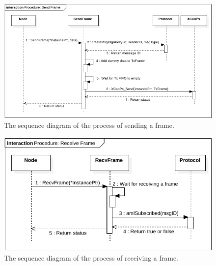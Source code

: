 \begin{figure}[h!]
	\centering
	\includegraphics[width = 1\linewidth]{graphics/SeqDiagram_SendFrame.pdf}
	\caption{The sequence diagram of the process of sending a frame.}
	\label{fig:SeqDiagram_SendFrame}
\end{figure}

\begin{figure}[h!]
	\centering
	\includegraphics[width = 1\linewidth]{graphics/SeqDiagram_RecvFrame.pdf}
	\caption{The sequence diagram of the process of receiving a frame.}
	\label{fig:SeqDiagram_RecvFrame}
\end{figure}